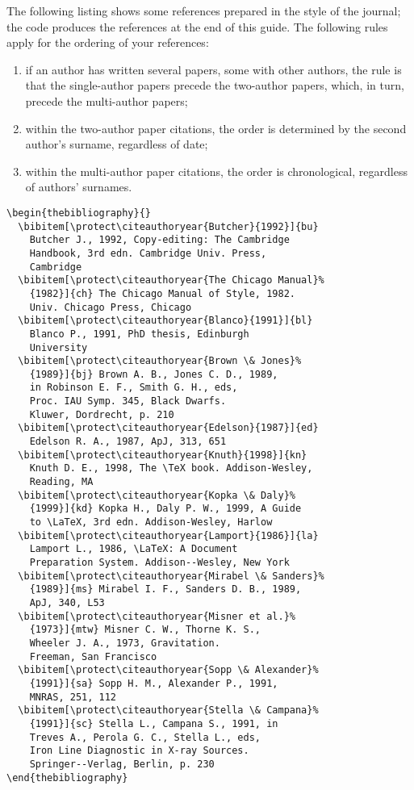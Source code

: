 \documentclass[useAMS,usenatbib]{mn2e}
\def\LaTeX{L\kern-.36em\raise.3ex\hbox{a}\kern-.15em
    T\kern-.1667em\lower.7ex\hbox{E}\kern-.125emX}
\begin{document}
The following listing shows some references prepared in the style of
the journal; the code produces the references at the end of this guide.
The following rules apply for the ordering of your references:
%
\begin{enumerate}
  \item if an author has written several papers, some with other authors,
        the rule is that the single-author papers precede the two-author
        papers, which, in turn, precede the multi-author papers;
  \item within the two-author paper citations, the order is determined
        by the second author's surname, regardless of date;
  \item within the multi-author paper citations, the order is
        chronological, regardless of authors' surnames.
\end{enumerate}
%
\begin{verbatim}
\begin{thebibliography}{}
  \bibitem[\protect\citeauthoryear{Butcher}{1992}]{bu}
    Butcher J., 1992, Copy-editing: The Cambridge
    Handbook, 3rd edn. Cambridge Univ. Press,
    Cambridge
  \bibitem[\protect\citeauthoryear{The Chicago Manual}%
    {1982}]{ch} The Chicago Manual of Style, 1982.
    Univ. Chicago Press, Chicago
  \bibitem[\protect\citeauthoryear{Blanco}{1991}]{bl}
    Blanco P., 1991, PhD thesis, Edinburgh
    University
  \bibitem[\protect\citeauthoryear{Brown \& Jones}%
    {1989}]{bj} Brown A. B., Jones C. D., 1989,
    in Robinson E. F., Smith G. H., eds,
    Proc. IAU Symp. 345, Black Dwarfs.
    Kluwer, Dordrecht, p. 210
  \bibitem[\protect\citeauthoryear{Edelson}{1987}]{ed}
    Edelson R. A., 1987, ApJ, 313, 651
  \bibitem[\protect\citeauthoryear{Knuth}{1998}]{kn}
    Knuth D. E., 1998, The \TeX book. Addison-Wesley,
    Reading, MA
  \bibitem[\protect\citeauthoryear{Kopka \& Daly}%
    {1999}]{kd} Kopka H., Daly P. W., 1999, A Guide
    to \LaTeX, 3rd edn. Addison-Wesley, Harlow
  \bibitem[\protect\citeauthoryear{Lamport}{1986}]{la}
    Lamport L., 1986, \LaTeX: A Document
    Preparation System. Addison--Wesley, New York
  \bibitem[\protect\citeauthoryear{Mirabel \& Sanders}%
    {1989}]{ms} Mirabel I. F., Sanders D. B., 1989,
    ApJ, 340, L53
  \bibitem[\protect\citeauthoryear{Misner et al.}%
    {1973}]{mtw} Misner C. W., Thorne K. S.,
    Wheeler J. A., 1973, Gravitation.
    Freeman, San Francisco
  \bibitem[\protect\citeauthoryear{Sopp \& Alexander}%
    {1991}]{sa} Sopp H. M., Alexander P., 1991,
    MNRAS, 251, 112
  \bibitem[\protect\citeauthoryear{Stella \& Campana}%
    {1991}]{sc} Stella L., Campana S., 1991, in
    Treves A., Perola G. C., Stella L., eds,
    Iron Line Diagnostic in X-ray Sources.
    Springer--Verlag, Berlin, p. 230
\end{thebibliography}
\end{verbatim}
\end{document}
